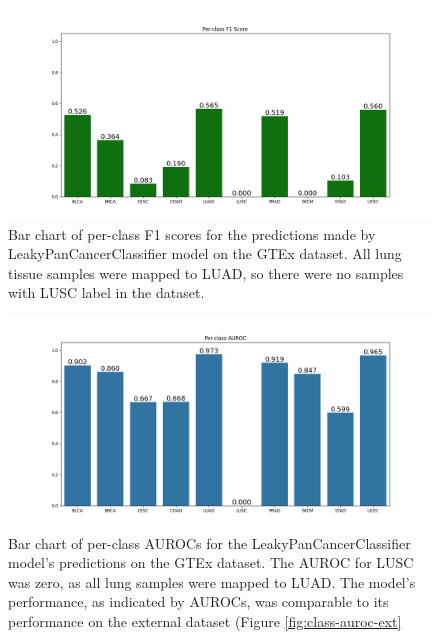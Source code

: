 \documentclass{l4proj}
\begin{document}
\begin{appendices}
\begin{figure}
    \centering
    \includegraphics[width=\linewidth]{images/per_class_f1_gtex.png}
    \caption{Bar chart of per-class F1 scores for the predictions made by LeakyPanCancerClassifier model on the GTEx dataset. All lung tissue samples were mapped to LUAD, so there were no samples with LUSC label in the dataset.}
    \label{fig:class-f1-gtex}
\end{figure}

\begin{figure}
    \centering
    \includegraphics[width=1\linewidth]{images/gtex_auroc.png}
    \caption{Bar chart of per-class AUROCs for the LeakyPanCancerClassifier model's predictions on the GTEx dataset. The AUROC for LUSC was zero, as all lung samples were mapped to LUAD.  The model's performance, as indicated by AUROCs, was comparable to its performance on the external dataset (Figure \ref{fig:class-auroc-ext}}
    \label{fig:gtex-auroc}
\end{figure}


\end{appendices}
\end{document}

